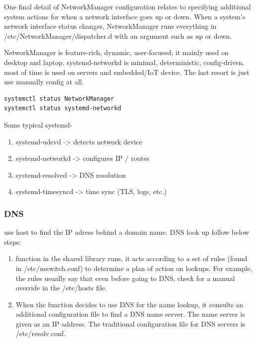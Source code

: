 \documentclass[paper=8.5in:11in, twoside, 12pt, pagesize=pdftex]{book}
\begin{document}
\par One final detail of NetworkManager configuration relates to specifying additional system actions for when a network interface goes up or down. When a system’s network interface status changes, NetworkManager runs everything in /etc/NetworkManager/dispatcher.d with an argument such as up or down.

\par NetworkManager is feature-rich, dynamic, user-focused; it mainly used on desktop and laptop. systemd-networkd is minimal, deterministic, config-driven. most of time is used on servers and embedded/IoT device. The last resort is just use manually config at all. 
\begin{lstlisting}
systemctl status NetworkManager
systemctl status systemd-networkd
\end{lstlisting}

\par Some typical systemd-
\begin{enumerate}
\item systemd-udevd        -> detects network device

\item systemd-networkd     -> configures IP / routes

\item systemd-resolved     -> DNS resolution

\item systemd-timesyncd    -> time sync (TLS, logs, etc.)
\end{enumerate}


\subsubsection{DNS}
\par use host to find the IP adress behind a domain name. DNS look up follow below steps:
\begin{enumerate}
\item function in the shared library runs, it acts according to a set of rules (found in /etc/nsswitch.conf) to determine a plan of action on lookups. For example, the rules usually say that even before going to DNS, check for a manual override in the /etc/hosts file.

\item When the function decides to use DNS for the name lookup, it consults an additional configuration file to find a DNS name server. The name server is given as an IP address. The traditional configuration file for DNS servers is /etc/resolv.conf.
\end{enumerate} 
\end{document}
